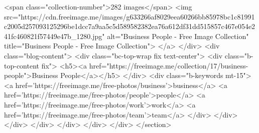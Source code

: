 <span class="collection-number">282 images</span>
<img src="https://cdn.freeimage.me/images/g633266af8029eea60266bb85978bc1c81991c2005d257093125296be1dcc7a9aa5c5d589582382ea76a612df31dd515857c467e054e241fc460821f57449e47b_1280.jpg" alt="Business People - Free Image Collection" title="Business People - Free Image Collection">
</a>
</div>
<div class="blog-content">
<div class="bc-top-wrap fix text-center">
<div class="b-top-content fix">
<h5><a href="https://freeimage.me/collection/17/business-people">Business People</a></h5>
</div>
<div class="b-keywords mt-15">
<a href='https://freeimage.me/free-photos/business'>business</a> <a href='https://freeimage.me/free-photos/people'>people</a> <a href='https://freeimage.me/free-photos/work'>work</a> <a href='https://freeimage.me/free-photos/team'>team</a>
</div>
</div>
 </div>
</div>
</div>
</div>
</div>
</section>

